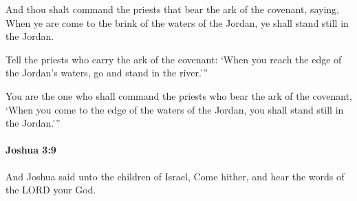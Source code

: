 			\begin{versebox}
					\item[BHS] 
					\item[ASV] And thou shalt command the priests that bear the ark of the covenant, saying, When ye are come to the brink of the waters of the Jordan, ye shall stand still in the Jordan.
					\item[NIV] Tell the priests who carry the ark of the covenant: ‘When you reach the edge of the Jordan’s waters, go and stand in the river.’”
					\item[NRSV] You are the one who shall command the priests who bear the ark of the covenant, ‘When you come to the edge of the waters of the Jordan, you shall stand still in the Jordan.’”
			\end{versebox}

		\paragraph{Joshua 3:9} %
			\label{JOSHUA-3-9}

			And Joshua said unto the children of Israel, Come hither, and hear the words of the LORD your God.

